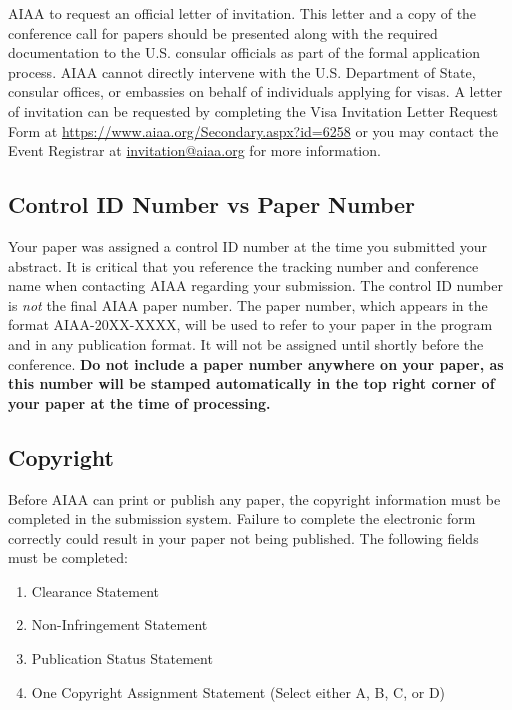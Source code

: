 \documentclass[conf]{new-aiaa}
\begin{document}
AIAA to request an official letter of invitation. This letter and a copy of the conference call for papers should be presented along with the required documentation to the U.S. consular officials as part of the formal application process.  AIAA cannot directly intervene with the U.S. Department of State, consular offices, or embassies on behalf of individuals applying for visas. A letter of invitation can be requested by completing the Visa Invitation Letter Request Form at \url{https://www.aiaa.org/Secondary.aspx?id=6258} or you may contact the Event Registrar at \url{invitation@aiaa.org} for more information.

\subsection{Control ID Number vs Paper Number}

Your paper was assigned a control ID number at the time you submitted your abstract. It is critical that you reference the tracking number and conference name when contacting AIAA regarding your submission. The control ID number is \emph{not} the final AIAA paper number. The paper number, which appears in the format AIAA-20XX-XXXX, will be used to refer to your paper in the program and in any publication format. It will not be assigned until shortly before the conference. \textbf{Do not include a paper number anywhere on your paper, as this number will be stamped automatically in the top right corner of your paper at the time of processing.}

\subsection{Copyright}

Before AIAA can print or publish any paper, the copyright information must be completed in the submission system. Failure to complete the electronic form correctly could result in your paper not being published. The following fields must be completed:

\begin{enumerate}
\item Clearance Statement
\item Non-Infringement Statement
\item Publication Status Statement
\item One Copyright Assignment Statement (Select either A, B, C, or D)
\end{enumerate}
\end{document}

